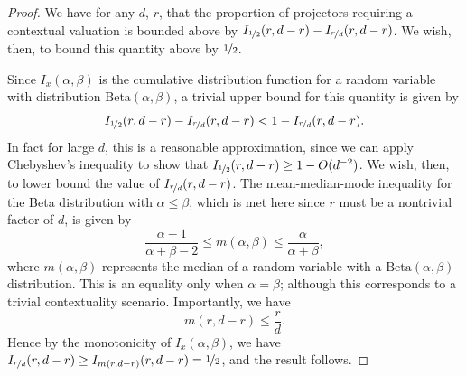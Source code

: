 \documentclass{amsart}
\theoremstyle{definition}
\begin{document}
\begin{proof}
We have for any $d$, $r$, that the proportion of projectors requiring a contextual valuation is bounded above by $I_{\nicefrac{1}{2}}(r,d-r)-I_{\nicefrac{r}{d}}(r,d-r)$. We wish, then, to bound this quantity above by $\nicefrac12$.

Since $I_x(\alpha,\beta)$ is the cumulative distribution function for a random variable with distribution $\mbox{Beta}(\alpha,\beta)$, a trivial upper bound for this quantity is given by
\begin{equation}
I_{\nicefrac{1}{2}}(r,d-r)-I_{\nicefrac{r}{d}}(r,d-r)< 1-I_{\nicefrac{r}{d}}(r,d-r).
\end{equation}
In fact for large $d$, this is a reasonable approximation, since we can apply Chebyshev's inequality to show that $I_{\nicefrac{1}{2}}(r,d-r)\geq1-O(d^{-2})$. We wish, then, to lower bound the value of $I_{\nicefrac{r}{d}}(r,d-r)$. The mean-median-mode inequality \cite{Kerm2011} for the Beta distribution with $\alpha\leq\beta$, which is met here since $r$ must be a nontrivial factor of $d$, is given by
\begin{equation}
\frac{\alpha-1}{\alpha+\beta-2}\leq m(\alpha,\beta)\leq\frac{\alpha}{\alpha+\beta},
\end{equation}
where $m(\alpha,\beta)$ represents the median of a random variable with a $\mbox{Beta}(\alpha,\beta)$ distribution. This is an equality only when $\alpha=\beta$; although this corresponds to a trivial contextuality scenario. Importantly, we have
\begin{equation}
m(r,d-r)\leq\frac{r}{d}.
\end{equation}
Hence by the monotonicity of $I_x(\alpha,\beta)$, we have $I_{\nicefrac{r}{d}}(r,d-r)\geq I_{m(r,d-r)}(r,d-r)=\nicefrac12$, and the result follows.

\end{proof}
\end{document}

